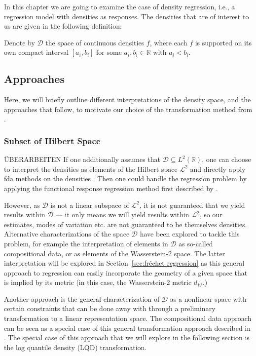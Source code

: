 In this chapter we are going to examine the case of density regression, i.e., a
regression model with densities as responses. The densities that are of interest to
us are given in the following definition:

\begin{definition}
    Denote by $\mathcal{D}$ the space of continuous densities $f$, where each
    $f$ is supported on its own compact interval $[a_i, b_i]$ for some $a_i, b_i \in
    \mathbb{R}$ with $a_i < b_i$.
\end{definition}

\subsection{Approaches}
\label{sec:approaches}
Here, we will briefly outline different interpretations of the density space, and the
approaches that follow, to motivate our choice of the transformation method from
\textcites{PetersenMüller2016}{KokoszkaEtAl2019}.

\subsubsection{Subset of Hilbert Space}
\label{sec:l2_interpretation}
ÜBERARBEITEN
If one additionally assumes that $\mathcal{D} \subseteq L^2(\mathbb{R})$, one can choose
to interpret the densities as elements of the Hilbert space $\mathcal{L}^2$ and directly
apply fda methods on the densities \parencite[see e.g.][]{KneipUtikal2001}. Then one
could handle the regression problem by applying the functional response regression method
first described by \textcite{Faraway1997}.

However, as $\mathcal{D}$ is not a linear subspace of $\mathcal{L}^2$, it is not guaranteed that
we yield results within $\mathcal{D}$ --- it only means we will yield results within $\mathcal{L}^2$,
so our estimates, modes of variation etc. are not guaranteed to be themselves densities.
Alternative characterizations of the space $\mathcal{D}$ have been explored to tackle
this problem, for example the interpretation of elements in $\mathcal{D}$ as so-called
compositional data, or as elements of the Wasserstein-2 space. The latter
interpretation will be explored in Section~\ref{sec:fréchet regression} as this general
approach to regression can easily incorporate the geometry of a given space that is
implied by its metric (in this case, the Wasserstein-2 metric $d_\mathcal{W}$.)

Another approach is the general characterization of $\mathcal{D}$ as a nonlinear space
with certain constraints that can be done away with through a preliminary transformation
to a linear representation space. The compositional data approach can be seen as a
special case of this general transformation approach described in \textcite{PetersenMüller2016}.
The special case of this approach that we will explore in the following section is the
log quantile density (LQD) transformation.


